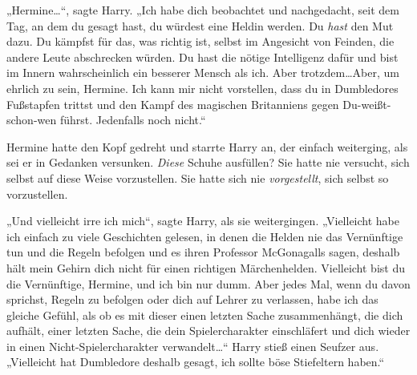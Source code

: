 „Hermine…“, sagte Harry. „Ich habe dich beobachtet und nachgedacht, seit dem Tag, an dem du gesagt hast, du würdest eine Heldin werden. Du \emph{hast} den Mut dazu. Du kämpfst für das, was richtig ist, selbst im Angesicht von Feinden, die andere Leute abschrecken würden. Du hast die nötige Intelligenz dafür und bist im Innern wahrscheinlich ein besserer Mensch als ich. Aber trotzdem…Aber, um ehrlich zu sein, Hermine. Ich kann mir nicht vorstellen, dass du in Dumbledores Fußstapfen trittst und den Kampf des magischen Britanniens gegen Du-weißt-schon-wen führst. Jedenfalls noch nicht.“

Hermine hatte den Kopf gedreht und starrte Harry an, der einfach weiterging, als sei er in Gedanken versunken. \emph{Diese} Schuhe ausfüllen? Sie hatte nie versucht, sich selbst auf diese Weise vorzustellen. Sie hatte sich nie \emph{vorgestellt}, sich selbst so vorzustellen.

„Und vielleicht irre ich mich“, sagte Harry, als sie weitergingen. „Vielleicht habe ich einfach zu viele Geschichten gelesen, in denen die Helden nie das Vernünftige tun und die Regeln befolgen und es ihren Professor McGonagalls sagen, deshalb hält mein Gehirn dich nicht für einen richtigen Märchenhelden. Vielleicht bist du die Vernünftige, Hermine, und ich bin nur dumm. Aber jedes Mal, wenn du davon sprichst, Regeln zu befolgen oder dich auf Lehrer zu verlassen, habe ich das gleiche Gefühl, als ob es mit dieser einen letzten Sache zusammenhängt, die dich aufhält, einer letzten Sache, die dein Spielercharakter einschläfert und dich wieder in einen Nicht-Spielercharakter verwandelt…“ Harry stieß einen Seufzer aus. „Vielleicht hat Dumbledore deshalb gesagt, ich sollte böse Stiefeltern haben.“

